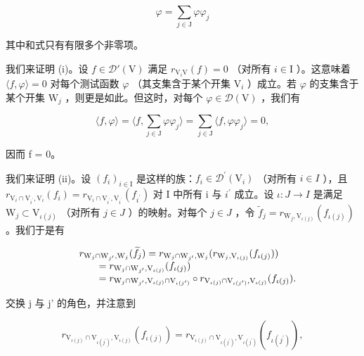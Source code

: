 \[
\varphi = \sum_ {j \in \mathrm{J}} \varphi \varphi_ {j}
\]

其中和式只有有限多个非零项。

我们来证明 (i)。设 \(f \in \mathcal{D}'(\mathrm{V})\) 满足 \(r_{\mathrm{V}_i\mathrm{V}}(f) = 0\) （对所有 \(i \in \mathrm{I}\) ）。这意味着 \(\langle f, \varphi \rangle = 0\) 对每个测试函数 \(\varphi\) （其支集含于某个开集 \(\mathrm{V}_i\) ）成立。若 \(\varphi\) 的支集含于某个开集 \(\mathrm{W}_j\) ，则更是如此。但这时，对每个 \(\varphi \in \mathcal{D}(\mathrm{V})\) ，我们有

\[
\langle f, \varphi \rangle = \langle f, \sum_ {j \in \mathrm{J}} \varphi \varphi_ {j} \rangle = \sum_ {j \in \mathrm{J}} \langle f, \varphi \varphi_ {j} \rangle = 0,
\]

因而 f = 0。

我们来证明 (ii)。设 \((f_{i})_{i\in\mathrm{I}}\) 是这样的族：\(f_{i}\in\mathcal{D}^{\prime}(\mathrm{V}_{i})\) （对所有 \(i\in I\) ），且 \(r_{\mathrm{V}_{i}\cap\mathrm{V}_{i^{\prime}},\mathrm{V}_{i}}(f_{i})=r_{\mathrm{V}_{i}\cap\mathrm{V}_{i^{\prime}},\mathrm{V}_{i^{\prime}}}(f_{i^{\prime}})\) 对 I 中所有 i 与 \(i^{\prime}\) 成立。设 \(\iota:J\to I\) 是满足 \(\mathrm{W}_{j}\subset\mathrm{V}_{\iota(j)}\) （对所有 \(j\in J\) ）的映射。对每个 \(j\in J\) ，令 \(\widetilde{f}_{j}=r_{\mathrm{W}_{j},\mathrm{V}_{\iota(j)}}(f_{\iota(j)})\) 。我们于是有

\[
\begin{array}{r l} & r _ {\mathrm{W} _ {j} \cap \mathrm{W} _ {j ^ {\prime}}, \mathrm{W} _ {j}} (\widetilde {f} _ {j}) = r _ {\mathrm{W} _ {j} \cap \mathrm{W} _ {j ^ {\prime}}, \mathrm{W} _ {j}} (r _ {\mathrm{W} _ {j}, \mathrm{V} _ {\iota (j)}} (f _ {\iota (j)})) \\ & \qquad = r _ {\mathrm{W} _ {j} \cap \mathrm{W} _ {j ^ {\prime}}, \mathrm{V} _ {\iota (j)}} (f _ {\iota (j)}) \\ & \qquad = r _ {\mathrm{W} _ {j} \cap \mathrm{W} _ {j ^ {\prime}}, \mathrm{V} _ {\iota (j)} \cap \mathrm{V} _ {\iota (j ^ {\prime})}} \circ r _ {\mathrm{V} _ {\iota (j)} \cap \mathrm{V} _ {\iota (j ^ {\prime})}, \mathrm{V} _ {\iota (j)}} (f _ {\iota (j)}). \end{array}
\]

交换 j 与 j' 的角色，并注意到

\[
r _ {\mathrm{V} _ {\iota (j)} \cap \mathrm{V} _ {\iota (j ^ {\prime})}, \mathrm{V} _ {\iota (j)}} (f _ {\iota (j)}) = r _ {\mathrm{V} _ {\iota (j)} \cap \mathrm{V} _ {\iota (j ^ {\prime})}, \mathrm{V} _ {\iota (j ^ {\prime})}} (f _ {\iota (j ^ {\prime})}),
\]

